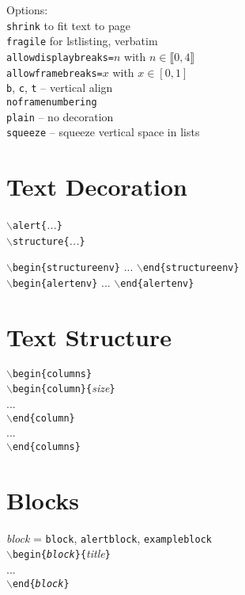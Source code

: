 \documentclass[a4paper,landscape]{article}
\newcommand{\cmdarg}[2]{\texttt{$\backslash$#1\{}\textit{#2}\texttt{\}}}
\newcommand{\dobegin}[1]{\texttt{$\backslash$begin\{#1\}}}
\newcommand{\doend}[1]{\texttt{$\backslash$end\{#1\}}}
\newcommand{\tab}{\hspace*{5mm}}
\begin{document}
\begin{multicols*}{3}
\medskip
Options: \\
\tab \texttt{shrink} to fit text to page \\
\tab \texttt{fragile} for lstlisting, verbatim \\
\tab \texttt{allowdisplaybreaks=}$n$ with $n \in \llbracket 0, 4 \rrbracket$ \\
\tab \texttt{allowframebreaks=}$x$ with $x \in [0, 1]$ \\
\tab \texttt{b}, \texttt{c}, \texttt{t} -- vertical align \\
\tab \texttt{noframenumbering} \\
\tab \texttt{plain} -- no decoration \\
\tab \texttt{squeeze} -- squeeze vertical space in lists

\section*{Text Decoration}

\cmdarg{alert}{...} \\
\cmdarg{structure}{...}

\medskip{}
\dobegin{structureenv} ... \doend{structureenv} \\
\dobegin{alertenv} ... \doend{alertenv} \\



\section*{Text Structure}

\dobegin{columns} \\
	\tab \dobegin{column}\texttt{\{}\textit{size}\texttt{\}} \\
	\tab \tab ... \\
	\tab \doend{column} \\
	\tab ... \\
\doend{columns}





\section*{Blocks}

\textit{block} = \texttt{block}, \texttt{alertblock}, \texttt{exampleblock} \\
\dobegin{\textit{block}}\texttt{\{}\textit{title}\texttt{\}} \\
	\tab ... \\
\doend{\textit{block}}



\end{multicols*}
\end{document}
